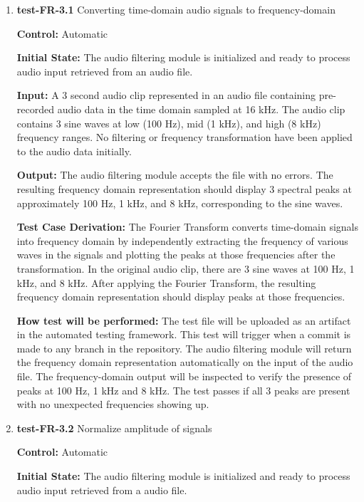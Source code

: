 \documentclass[12pt, titlepage]{article}
\begin{document}
\begin{enumerate}

\item{\textbf{test-FR-3.1} Converting time-domain audio signals to 
frequency-domain \\}

\textbf{Control:} Automatic
					
\textbf{Initial State:} 
The audio filtering module is initialized and ready to process audio input 
retrieved from an audio file. 
					
\textbf{Input:}
A 3 second audio clip represented in an audio file containing pre-recorded audio 
data in the time domain sampled at 16 kHz. The audio clip contains 3 sine waves 
at low (100 Hz), mid (1 kHz), and high (8 kHz) frequency ranges. No filtering 
or frequency transformation have been applied to the audio data initially.
					
\textbf{Output:}
The audio filtering module accepts the file with no errors. The resulting 
frequency domain representation should display 3 spectral peaks at 
approximately 100 Hz, 1 kHz, and 8 kHz, corresponding to the sine waves.

\textbf{Test Case Derivation:} 
The Fourier Transform converts time-domain signals into frequency domain by 
independently extracting the frequency of various waves in the signals and 
plotting the peaks at those frequencies after the transformation. In the 
original audio clip, there are 3 sine waves at 100 Hz, 1 kHz, and 8 kHz. After
applying the Fourier Transform, the resulting frequency domain representation
should display peaks at those frequencies.
					
\textbf{How test will be performed:}
The test file will be uploaded as an artifact in the automated testing 
framework. This test will trigger when a commit is made to any branch in the 
repository. The audio filtering module will return the frequency domain 
representation automatically on the input of the audio file. The 
frequency-domain output will be inspected to verify the presence of peaks at 
100 Hz, 1 kHz and 8 kHz. The test passes if all 3 peaks are present with no 
unexpected frequencies showing up.  
					
\item{\textbf{test-FR-3.2} Normalize amplitude of signals\\}

\textbf{Control:} Automatic
					
\textbf{Initial State:} 
The audio filtering module is initialized and ready to process audio input 
retrieved from a audio file. 
					

\end{enumerate}
\end{document}
